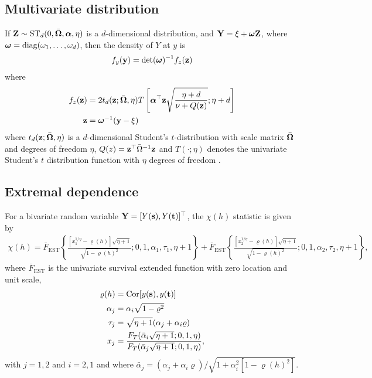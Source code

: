 \subsection*{Multivariate \skewt{} distribution}

If $\mathbf{Z} \sim \text{ST}_d(0, \bar{\mbox{\boldmath $\Omega$}}, \mbox{\boldmath $\alpha$}, \eta)$ is a $d$-dimensional \skewt{} distribution, and $\mathbf{Y} = \xi + \mbox{\boldmath $\omega$} \mathbf{Z}$, where $\mbox{\boldmath $\omega$} = \text{diag}(\omega_1, \ldots, \omega_d)$, then the density of $Y$ at $y$ is
\begin{align}
  f_y(\mathbf{y}) = \det(\mbox{\boldmath $\omega$})^{-1} f_z(\mathbf{z})
\end{align}
where
\begin{align}
  f_z(\mathbf{z}) &= 2 t_d(\mathbf{z}; \bar{\mbox{\boldmath $\Omega$}}, \eta) T \left[ \mbox{\boldmath $\alpha$}^\top \mathbf{z} \sqrt{ \frac{\eta + d}{\nu + Q(\mathbf{z})} }; \eta + d\right] \\
  \mathbf{z} &= \mbox{\boldmath $\omega$}^{-1}(\mathbf{y} - \xi)
\end{align}
where $t_d(\mathbf{z}; \bar{\mbox{\boldmath $\Omega$}}, \eta)$ is a $d$-dimensional Student's $t$-distribution with scale matrix $\bar{\mbox{\boldmath $\Omega$}}$ and degrees of freedom $\eta$, $Q(z) = \mathbf{z}^\top \bar{\Omega}^{-1}\mathbf{z}$ and $T(\cdot; \eta)$ denotes the univariate Student's $t$ distribution function with $\eta$ degrees of freedom \citep{Azzalini2014}.

\subsection*{Extremal dependence}

For a bivariate \skewt{} random variable $\mathbf{Y} = [Y(\mathbf{s}), Y(\mathbf{t})]^\top$, the $\chi(h)$ statistic \citep{Padoan2011} is given by
\begin{align} \label{steq:chiskew-t}
  \chi(h) = \bar{F}_{\text{EST}}\left\{ \frac{[x_1^{1 / \eta} - \varrho(h)] \sqrt{\eta + 1} }{\sqrt{1 - \varrho(h)^2}}; 0, 1, \alpha_1, \tau_1, \eta + 1 \right\} + \bar{F}_{\text{EST}}\left\{ \frac{ [x_2^{1 / \eta} - \varrho(h)] \sqrt{\eta + 1} }{ \sqrt{1 - \varrho(h)^2} }; 0, 1, \alpha_2, \tau_2, \eta + 1 \right\},
\end{align}
where $\bar{F}_{\text{EST}}$ is the univariate survival extended \skewt{} function with zero location and unit scale,
\begin{align*}
  \varrho(h) &= \text{Cor}[y(\mathbf{s}), y(\mathbf{t})]\\
  \alpha_j &= \alpha_i \sqrt{1 - \varrho^2}\\
  \tau_j &= \sqrt{\eta + 1}(\alpha_j + \alpha_i \varrho)\\
  x_j &= \displaystyle\frac{F_T(\bar{\alpha}_i \sqrt{\eta + 1}; 0, 1, \eta)}{F_T(\bar{\alpha}_j \sqrt{\eta + 1}; 0, 1, \eta)},
\end{align*}
with $j = 1, 2$ and $i = 2, 1$ and where $\bar{\alpha}_j = (\alpha_j + \alpha_i \varrho) / \sqrt{ 1 + \alpha_i^2 [1 - \varrho(h)^2]}$.

